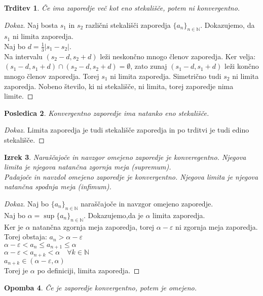 \documentclass[11pt]{article}
\newtheorem{Izrek}{{\sc Izrek}}[section]
\newtheorem{Trditev}[Izrek]{{\sc Trditev}}
\newtheorem{Posledica}[Izrek]{{\sc Posledica}}
\newtheorem{Opomba}[Izrek]{{\sc Opomba}}
\newenvironment{dokaz}[1][{\sc Dokaz}]{\begin{proof}[#1]\renewcommand*{\qedsymbol}{\(\blacksquare\)}}{\end{proof}}
\begin{document}
\begin{Trditev}
	Če ima zaporedje več kot eno stekališče, potem ni konvergentno.
\end{Trditev}
\begin{dokaz}
	Naj bosta $s_1$ in $s_2$ različni stekališči zaporedja $\{a_n\}_{n\in \mathbb{N}}$.
	Dokazujemo, da $s_1$ ni limita zaporedja.
	\\
	Naj bo $d = \frac{1}{3}|s_1 - s_2|$.
	\\
	 Na intervalu $(s_2 - d, s_2 + d)$ leži neskončno mnogo členov zaporedja. Ker velja: $(s_1 -d, s_1+d) \cap (s_2 - d, s_2 + d) = \emptyset$, zato zunaj 	$(s_1 -d, s_1+d)$ leži končno mnogo členov zaporedja. Torej $s_1$ ni limita zaporedja. Simetrično tudi $s_2$ ni limita zaporedja. Nobeno število, ki ni stekališče, ni limita, torej zaporedje nima limite.
\end{dokaz}
\begin{Posledica}
	Konvergentno zaporedje ima natanko eno stekališče.
\end{Posledica}
\begin{dokaz}
	Limita zaporedja je tudi stekališče zaporedja in po trditvi je tudi edino stekališče.
\end{dokaz}
\begin{Izrek}
	Naraščajoče in navzgor omejeno zaporedje je konveregentno. Njegova limita je njegova natančna zgornja meja (supremum).
	\\
	Padajoče in navzdol omejeno zaporedje je konvergentno. Njegova limita je njegova natančna spodnja meja (infimum).
\end{Izrek}
\begin{dokaz}
	Naj bo $\{a_n\}_{n\in \mathbb{N}}$ naraščajoče in navzgor omejeno zaporedje.\\
	Naj bo $\alpha = \sup{\{a_n\}_{n\in \mathbb{N}}}$. Dokazujemo,da je $\alpha$ limita zaporedja.
	\\
	Ker je $\alpha$ natančna zgornja meja zaporedja, torej $\alpha - \varepsilon$ ni zgornja meja zaporedja.
	\\
	Torej obstaja: $a_n > \alpha - \varepsilon$
	\\
	$\alpha - \varepsilon < a_n \le a_{n+1} \le \alpha$
	\\
	$\alpha - \varepsilon < a_{n+k} < \alpha \quad \forall k \in \mathbb{N}$
	\\
	$a_{n+k} \in (\alpha - \varepsilon, \alpha)$
	\\
	Torej je $\alpha$ po definiciji, limita zaporedja.
\end{dokaz}
\begin{Opomba}
	Če je zaporedje konvergentno, potem je omejeno.
\end{Opomba}
\end{document}
